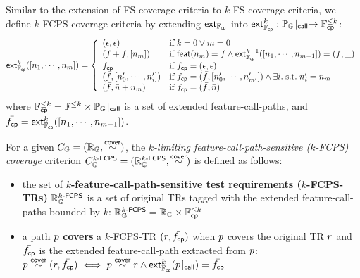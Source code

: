 Similar to the extension of FS coverage criteria to $k$-FS coverage criteria,
we define $k$-FCPS coverage criteria by extending $\textsf{ext}_{\mathbb{F}_{\textsf{cp}}}$ into $\textsf{ext}_{\mathbb{F}_{\textsf{cp}}}^{k}:
{\mathbb{P}_{\mathbb{G}}}\!\mid_{\textsf{call}} \rightarrow \mathbb{F}_{\textsf{cp}}^{\leq k}$:
%
\begin{equation}\label{equ:extfcps}
  \textsf{ext}_{\mathbb{F}_{\textsf{cp}}}^{k}([n_1, \cdots, n_m]) = \left\{
    \begin{array}{ll}
      (\epsilon, \epsilon) & \text{if} \; k = 0 \vee m = 0\\

      (\bar{f} + f, [n_m]) & \text{if} \; \textsf{feat}(n_m) = f \wedge
      \textsf{ext}_{\mathbb{F}_{\textsf{cp}}}^{k-1}([n_1, \cdots, n_{m-1}]) = (\bar{f}, \_)\\

      \bar{f_{\textsf{cp}}} & \text{if} \; \bar{f_{\textsf{cp}}} = (\epsilon, \epsilon)\\

      (\bar{f}, [n'_0, \cdots, n'_i]) &
      \text{if} \; f_{\textsf{cp}} = (\bar{f}, [n'_0, \cdots, n'_{m'}]) \wedge
      \exists i. {\; \text{s.t.} \; } n'_i = n_m\\

      (\bar{f}, \bar{n} + n_m) & \text{if} \; f_{\textsf{cp}} = (\bar{f}, \bar{n})\\
    \end{array}
  \right.
\end{equation}
%
where $\mathbb{F}_{\textsf{cp}}^{\leq k} = \mathbb{F}^{\leq k} \times {\mathbb{P}_{\mathbb{G}}}\!\mid_{\textsf{call}}$ is a
set of extended feature-call-paths, and $\bar{f_{\textsf{cp}}} = \textsf{ext}_{\mathbb{F}_{\textsf{cp}}}^{k}([n_1, \cdots,
n_{m-1}])$.


\begin{definition}\label{def:k-fcps-cov}
  For a given $C_{\mathbb{G}} = (\mathbb{R}_{\mathbb{G}}, \overset{\textsf{cover}}{\sim})$, the
  \textit{$k$-limiting feature-call-path-sensitive ($k$-FCPS) coverage}
  criterion $C_{\mathbb{G}}^{{k}\textsf{-FCPS}} = (\mathbb{R}_{\mathbb{G}}^{{k}\textsf{-FCPS}}, \overset{\textsf{cover}}{\sim})$ is defined
  as follows:
  \begin{itemize}
    \item the set of \textbf{$k$-feature-call-path-sensitive test requirements
      ($k$-FCPS-TRs)} $\mathbb{R}_{\mathbb{G}}^{{k}\textsf{-FCPS}}$ is a set of original TRs tagged
      with the extended feature-call-paths bounded by $k$:
$
        \mathbb{R}_{\mathbb{G}}^{{k}\textsf{-FCPS}} = \mathbb{R}_{\mathbb{G}} \times \mathbb{F}_{\textsf{cp}}^{\leq k}
$
    \item a path $p$ \textbf{covers} a $k$-FCPS-TR $(r, \bar{f_{\textsf{cp}}})$ when $p$
      covers the original TR $r$ and $\bar{f_{\textsf{cp}}}$ is the extended feature-call-path
      extracted from $p$:
$
        p \overset{\textsf{cover}}{\sim} (r, \bar{f_{\textsf{cp}}}) \iff p \overset{\textsf{cover}}{\sim} r \wedge
        \textsf{ext}_{\mathbb{F}_{\textsf{cp}}}^{k}({p}\!\mid_{\textsf{call}}) = \bar{f_{\textsf{cp}}}
$
  \end{itemize}
\end{definition}

